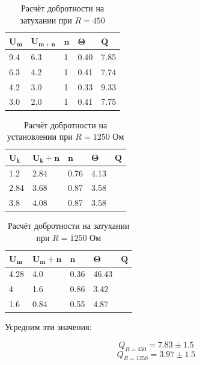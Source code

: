 \documentclass{lab}
\begin{document}
\begin{table}[h!]
    \centering
    \begin{tabular}{|l|l|l|l|l|}
        \hline
        $\mathbf{U_m}$ & $\mathbf{U_{m+n}}$ & $\mathbf{n}$ & $\mathbf{\Theta}$ & $\mathbf{Q}$ \\ \hline
        9.4 & 6.3 &  1           & 0.40                 & 7.85         \\ \hline
        6.3 & 4.2 &  1           & 0.41                 & 7.74         \\ \hline
        4.2 & 3.0 &  1           & 0.33                 & 9.33         \\ \hline
        3.0  & 2.0    & 1            & 0.41             & 7.75         \\ \hline
    \end{tabular}
    \caption{Расчёт добротности на затухании при $R=450$}
\end{table}

\begin{table}[h!]
    \centering
    \begin{tabular}{|l|l|l|l|l|}
        \hline
        $\mathbf{U_k}$ & $\mathbf{U_k+n}$ & $\mathbf{n}$ & $\mathbf{\Theta}$ & $\mathbf{Q}$ \\ \hline
        1.2 & 2.84  & 0.76 & 4.13\\ \hline
        2.84 & 3.68 & 0.87 & 3.58\\ \hline
        3.8 & 4.08  & 0.87 & 3.58\\ \hline
    \end{tabular}
    \caption{Расчёт добротности на установлении при $R=1250$ Ом}
\end{table}

\begin{table}[h!]
    \centering
    \begin{tabular}{|l|l|l|l|l|}
        \hline
        $\mathbf{U_m}$ & $\mathbf{U_m+n}$ & $\mathbf{n}$ & $\mathbf{\Theta}$ & $\mathbf{Q}$ \\ \hline
        4.28 & 4.0  & 0.36 & 46.43\\ \hline
        4    & 1.6  & 0.86 & 3.42\\ \hline
        1.6  & 0.84 & 0.55 & 4.87\\ \hline
    \end{tabular}
    \caption{Расчёт добротности на затухании при $R=1250$ Ом}
\end{table}

Усредним эти значения:

\begin{equation}
    Q_{R=450} = 7.83 \pm 1.5
\end{equation}
\begin{equation}
    Q_{R=1250} = 3.97 \pm 1.5
\end{equation}
\end{document}

